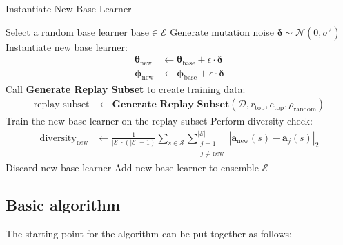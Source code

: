 \documentclass[12pt]{article}
\begin{document}
\begin{algorithm}[H]
\caption{Instantiate New Base Learner}
\begin{algorithmic}[1]
\State Select a random base learner $\text{base} \in \mathcal{E}$
\State Generate mutation noise $\bm{\delta} \sim \mathcal{N}(0, \sigma^2)$
\State Instantiate new base learner:
\begin{align*}
    \bm{\theta}_{\text{new}} &\gets \bm{\theta}_{\text{base}} + \epsilon \cdot \bm{\delta} \\
    \bm{\phi}_{\text{new}} &\gets \bm{\phi}_{\text{base}} + \epsilon \cdot \bm{\delta}
\end{align*}
\State Call \textbf{Generate Replay Subset} to create training data:
\begin{align*}
    \text{replay subset} &\gets \textbf{Generate Replay Subset}(\mathcal{D}, r_{\text{top}}, e_{\text{top}}, \rho_{\text{random}})
\end{align*}
\State Train the new base learner on the replay subset
\State Perform diversity check:
\begin{align*}
    \text{diversity}_{\text{new}} &\gets \frac{1}{|\mathcal{S}| \cdot (|\mathcal{E}|-1)} 
    \sum_{s \in \mathcal{S}} \sum_{\substack{j=1 \\ j \neq \text{new}}}^{|\mathcal{E}|} 
    \left| \bm{a}_{\text{new}}(s) - \bm{a}_j(s) \right|_2
\end{align*}
    \State Discard new base learner
\Else
    \State Add new base learner to ensemble $\mathcal{E}$
\EndIf
\end{algorithmic}
\end{algorithm}

\subsection{Basic algorithm}

The starting point for the algorithm can be put together as follows:
\end{document}

